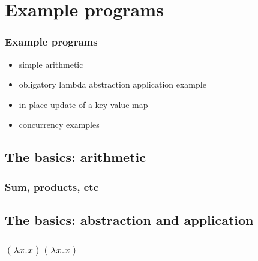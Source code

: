 \documentclass{beamer}
\begin{document}
  \section{Example programs}
  \begin{frame}
    \frametitle{Example programs}
    \begin{itemize}
      \item simple arithmetic
      \item obligatory lambda abstraction application example
      \item in-place update of a key-value map
      \item concurrency examples        
    \end{itemize}
  \end{frame}
  \subsection{The basics: arithmetic}
  \begin{frame}
    \frametitle{Sum, products, etc}    
  \end{frame}
  \subsection{The basics: abstraction and application}
  \begin{frame}
    \frametitle{$(\lambda x.x)(\lambda x.x)$}    
  \end{frame}
\end{document}
